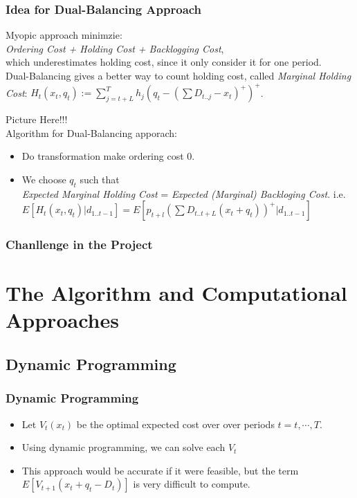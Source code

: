 \documentclass{beamer}
\begin{document}
\begin{frame}
    \frametitle{Idea for Dual-Balancing Approach}    
     Myopic approach minimzie:\\
     {\em Ordering Cost + Holding Cost + Backlogging Cost},\\
      which underestimates holding cost, since it only consider it for one period.\\
    Dual-Balancing gives a better way to count holding cost, called {\em Marginal Holding Cost}:
    $H_t(x_t,q_t) := \sum_{j = t+L}^{T} h_j (q_t - (\sum D_{t..j} - x_t)^+)^+$.

    Picture Here!!!\\
    Algorithm for Dual-Balancing apporach:
    \begin{itemize}
      \item 
        Do transformation make ordering cost 0.
      \item
        We choose $q_t$ such that\\
        {\em Expected Marginal Holding Cost} = {\em Expected (Marginal) Backloging Cost}. i.e.\\
        $E[H_t(x_t,q_t)| d_{1..t-1}] = E[p_{t+l}(\sum D_{t..t+L} (x_t + q_t))^+ | d_{1..t-1}]$
    \end{itemize}
\end{frame}

\begin{frame}
    \frametitle{Chanllenge in the Project}    
    
\end{frame}


  \section{The Algorithm and Computational Approaches}
    \subsection{Dynamic Programming}
    \begin{frame}
    \frametitle{Dynamic Programming}
      \begin{itemize}
        \item Let $V_{t}\left(x_{t}\right)$ be the optimal expected cost over over periods $t=t,\cdots,T.$
        \item Using dynamic programming, we can solve each $V_{t}$
        \item This approach would be accurate if it were feasible, but the term $E\left[V_{t+1}\left(x_{t}+q_{t}-D_{t}\right)\right]$ is very difficult to compute.
      \end{itemize}
    \end{frame}
\end{document}
